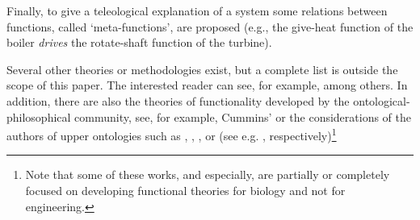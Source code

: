 \documentclass[
]{ceurart}
\begin{document}
\begin{itemize}
    Finally, to give a teleological explanation of a system some relations between functions, called `meta-functions', are proposed (e.g., the give-heat function of the boiler \textit{drives} the rotate-shaft function of the turbine). 
\end{itemize}
Several other theories or methodologies exist, but a complete list is outside the scope of this paper. The interested reader can see, for example, \cite{umedaFunctionBehaviourStructure1990,qianFunctionBehaviorStructure1996, zhaoStateBehaviorFunction2019} among others.
In addition, there are also the theories of functionality developed by the ontological-philosophical community, see, for example, Cummins'\cite{cumminsFunctionalAnalysis1975} or the considerations of the authors of upper ontologies such as \BFO, \GFO, \YAMATO, or \DOLCE (see e.g. \cite{spearFunctionsBasicFormal2016, herreGeneralFormalOntology2006, sasajimaFBRLFunctionBehavior1995, borgoFormalOntologicalPerspective2009}, respectively)\footnote{Note that some of these works, \BFO and \GFO especially, are partially or completely focused on developing functional theories for biology and not for engineering.}
\end{document}
